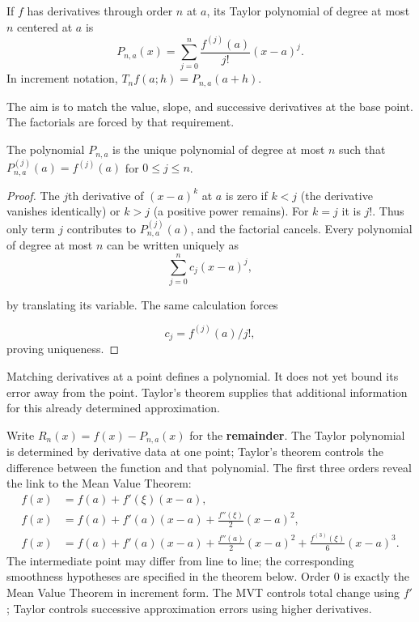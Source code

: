 \begin{definition}\label{def:ordinary-taylor-polynomial}
If $f$ has derivatives through order $n$ at $a$, its Taylor polynomial
of degree at most $n$ centered at $a$ is
\[
P_{n,a}(x)=\sum_{j=0}^n\frac{f^{(j)}(a)}{j!}(x-a)^j.
\]
In increment notation, $T_nf(a;h)=P_{n,a}(a+h)$.
\end{definition}
The aim is to match the value, slope, and successive derivatives at the
base point. The factorials are forced by that requirement.
\begin{proposition}\label{prop:taylor-matching}
The polynomial $P_{n,a}$ is the unique polynomial of degree at most $n$
such that $P_{n,a}^{(j)}(a)=f^{(j)}(a)$ for $0\leq j\leq n$.
\end{proposition}
\begin{proof}
The $j$th derivative of $(x-a)^k$ at $a$ is zero if $k<j$ (the
derivative vanishes identically) or $k>j$ (a positive power remains).
For $k=j$ it is $j!$. Thus only term $j$ contributes to
$P_{n,a}^{(j)}(a)$, and the factorial cancels. Every polynomial of degree
at most $n$ can be written uniquely as
\[
\sum_{j=0}^n c_j(x-a)^j,
\]

by translating its variable. The same calculation forces

\[
c_j=f^{(j)}(a)/j!,
\]
 proving uniqueness.
\end{proof}
Matching derivatives at a point defines a polynomial. It does not yet
bound its error away from the point. Taylor's theorem supplies that
additional information for this already determined approximation.

Write $R_n(x)=f(x)-P_{n,a}(x)$ for the \textbf{remainder}. The
Taylor polynomial is determined by derivative data at one point; Taylor's
theorem controls the difference between the function and that polynomial.
The first three orders reveal the link to the Mean Value Theorem:
\[
\begin{aligned}
f(x)&=f(a)+f'(\xi)(x-a),\\
f(x)&=f(a)+f'(a)(x-a)+\frac{f''(\xi)}2(x-a)^2,\\
f(x)&=f(a)+f'(a)(x-a)+\frac{f''(a)}2(x-a)^2
       +\frac{f^{(3)}(\xi)}6(x-a)^3.
\end{aligned}
\]
The intermediate point may differ from line to line; the corresponding
smoothness hypotheses are specified in the theorem below. Order $0$ is
exactly the Mean Value Theorem in increment form. The MVT controls total
change using $f'$; Taylor controls successive approximation errors using
higher derivatives.

